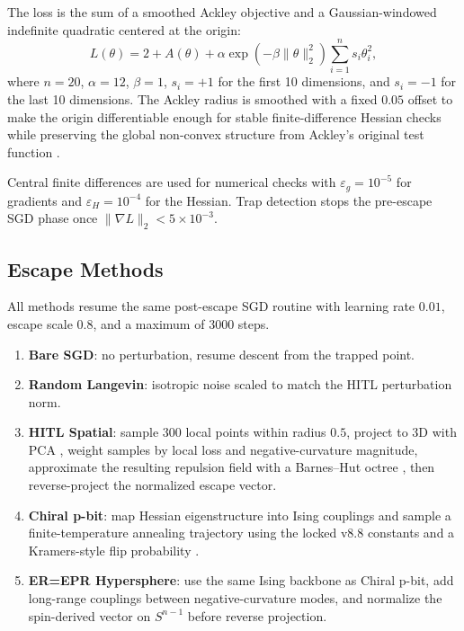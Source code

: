 \documentclass[11pt]{article}
\begin{document}
The loss is the sum of a smoothed Ackley objective and a Gaussian-windowed indefinite quadratic centered at the origin:
\begin{equation}
L(\theta) =
2 + A(\theta) + \alpha \exp(-\beta \lVert \theta \rVert_2^2)
\sum_{i=1}^{n} s_i \theta_i^2,
\end{equation}
where \(n=20\), \(\alpha = 12\), \(\beta = 1\), \(s_i = +1\) for the first 10 dimensions, and \(s_i = -1\) for the last 10 dimensions. The Ackley radius is smoothed with a fixed \(0.05\) offset to make the origin differentiable enough for stable finite-difference Hessian checks while preserving the global non-convex structure from Ackley's original test function \cite{ackley1987}.

Central finite differences are used for numerical checks with \(\varepsilon_g = 10^{-5}\) for gradients and \(\varepsilon_H = 10^{-4}\) for the Hessian. Trap detection stops the pre-escape SGD phase once \(\lVert \nabla L \rVert_2 < 5 \times 10^{-3}\).

\subsection{Escape Methods}

All methods resume the same post-escape SGD routine with learning rate \(0.01\), escape scale \(0.8\), and a maximum of 3000 steps.

\begin{enumerate}[leftmargin=1.5em]
  \item \textbf{Bare SGD}: no perturbation, resume descent from the trapped point.
  \item \textbf{Random Langevin}: isotropic noise scaled to match the HITL perturbation norm.
  \item \textbf{HITL Spatial}: sample 300 local points within radius \(0.5\), project to 3D with PCA \cite{pearson1901}, weight samples by local loss and negative-curvature magnitude, approximate the resulting repulsion field with a Barnes--Hut octree \cite{barnes1986}, then reverse-project the normalized escape vector.
  \item \textbf{Chiral p-bit}: map Hessian eigenstructure into Ising couplings and sample a finite-temperature annealing trajectory using the locked v8.8 constants and a Kramers-style flip probability \cite{kramers1940,kirkpatrick1983,camsari2017}.
  \item \textbf{ER=EPR Hypersphere}: use the same Ising backbone as Chiral p-bit, add long-range couplings between negative-curvature modes, and normalize the spin-derived vector on \(S^{n-1}\) before reverse projection.
\end{enumerate}
\end{document}
